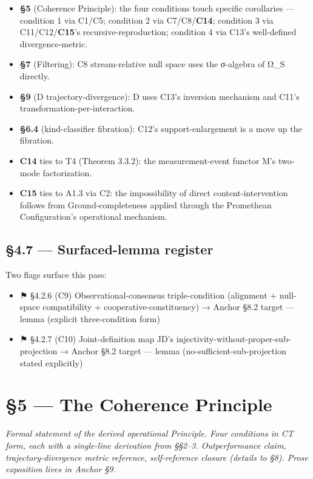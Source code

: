 \documentclass[11pt, openany]{book}
\newcommand{\sectionbreak}{\clearpage}
\begin{document}
\begin{itemize}
\item \textbf{§5} (Coherence Principle): the four conditions touch specific corollaries --- condition 1 via C1/C5; condition 2 via C7/C8/\textbf{C14}; condition 3 via C11/C12/\textbf{C15}'s recursive-reproduction; condition 4 via C13's well-defined divergence-metric.
\item \textbf{§7} (Filtering): C8 stream-relative null space uses the σ-algebra of Ω\_\allowbreak{}S directly.
\item \textbf{§9} (D trajectory-divergence): D uses C13's inversion mechanism and C11's transformation-per-interaction.
\item \textbf{§6.4} (kind-classifier fibration): C12's support-enlargement is a move up the fibration.
\item \textbf{C14} ties to T4 (Theorem 3.3.2): the measurement-event functor M's two-mode factorization.
\item \textbf{C15} ties to A1.3 via C2: the impossibility of direct content-intervention follows from Ground-completeness applied through the Promethean Configuration's operational mechanism.
\end{itemize}

\sectionbreak

\section{§4.7 --- Surfaced-lemma register}

Two flags surface this pass:

\begin{itemize}
\item ⚑ §4.2.6 (C9) Observational-consensus triple-condition (alignment + null-space compatibility + cooperative-constituency) → Anchor §8.2 target --- lemma (explicit three-condition form)
\item ⚑ §4.2.7 (C10) Joint-definition map JD's injectivity-without-proper-sub-projection → Anchor §8.2 target --- lemma (no-sufficient-sub-projection stated explicitly)
\end{itemize}

\sectionbreak


\chapter{§5 — The Coherence Principle}


\textit{Formal statement of the derived operational Principle. Four conditions in CT form, each with a single-line derivation from §§2–3. Outperformance claim, trajectory-divergence metric reference, self-reference closure (details to §8). Prose exposition lives in Anchor §9.}
\end{document}
